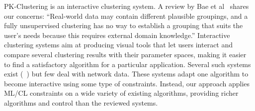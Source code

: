 PK-Clustering is an interactive clustering system. A review by Bae et al~\cite{baeInteractiveClusteringComprehensive2020} shares our concerns:
``Real-world data may contain different plausible groupings, and a fully unsupervised clustering has no way to establish a grouping that suits the user’s needs because this requires external domain knowledge.''
Interactive clustering systems aim at producing visual tools that let users interact and compare several clustering results with their parameter spaces, making it easier to find a satisfactory algorithm for a particular application. Several such systems exist (\eg~\cite{cavalloClustrophileGuidedVisual2019, xclusim}) but few deal with network data.
These systems adapt one algorithm to become interactive using some type of constraints.
Instead, our approach applies ML/CL constraints on a wide variety of existing algorithms, providing richer algorithms and control than the reviewed systems.




